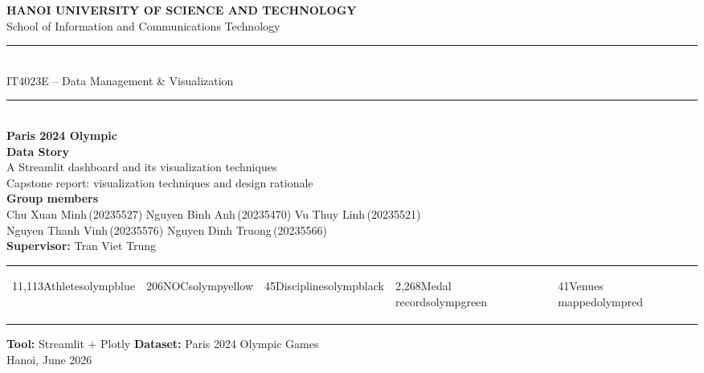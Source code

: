 \documentclass[11pt]{article}
\begin{document}
\begin{titlepage}
\thispagestyle{empty}
\centering
\vspace*{0.7cm}
{\sffamily\bfseries\color{charcoal}\large HANOI UNIVERSITY OF SCIENCE AND TECHNOLOGY}\\[3pt]
{\sffamily\color{slate} School of Information and Communications Technology}\\[16pt]
{\color{gold}\rule{\linewidth}{2pt}}\\[6pt]
{\sffamily\color{slate}\large IT4023E -- Data Management \& Visualization}\\[10pt]
{\color{gold}\rule{\linewidth}{2pt}}\\[1.7cm]

{\sffamily\bfseries\color{charcoal}\fontsize{30}{34}\selectfont
Paris 2024 Olympic\\[6pt] Data Story}\\[10pt]
{\sffamily\Large\color{teal} A Streamlit dashboard and its visualization techniques}\\[6pt]
{\sffamily\large\color{slate} Capstone report: visualization techniques and design rationale}\\[14pt]
{\sffamily\color{charcoal}\normalsize\textbf{Group members}}\\[4pt]
{\sffamily\color{slate}\small
Chu Xuan Minh\,(20235527) \quad Nguyen Binh Anh\,(20235470) \quad Vu Thuy Linh\,(20235521)\\[3pt]
Nguyen Thanh Vinh\,(20235576) \quad Nguyen Dinh Truong\,(20235566)}\\[8pt]
{\sffamily\color{slate}\textbf{Supervisor:} Tran Viet Trung}\\[1.8cm]

\begin{tabularx}{\linewidth}{XXXXX}
\begin{kpicard}{11{,}113}{Athletes}{olympblue} \end{kpicard} &
\begin{kpicard}{206}{NOCs}{olympyellow} \end{kpicard} &
\begin{kpicard}{45}{Disciplines}{olympblack} \end{kpicard} &
\begin{kpicard}{2{,}268}{Medal records}{olympgreen} \end{kpicard} &
\begin{kpicard}{41}{Venues mapped}{olympred} \end{kpicard} \\
\end{tabularx}
\vspace{1.6cm}

{\sffamily\large\color{charcoal}\textbf{Tool:} Streamlit + Plotly \qquad \textbf{Dataset:} Paris 2024 Olympic Games}\\[6pt]
\vfill
{\sffamily\color{charcoal} Hanoi, June 2026}
\end{titlepage}
\end{document}

